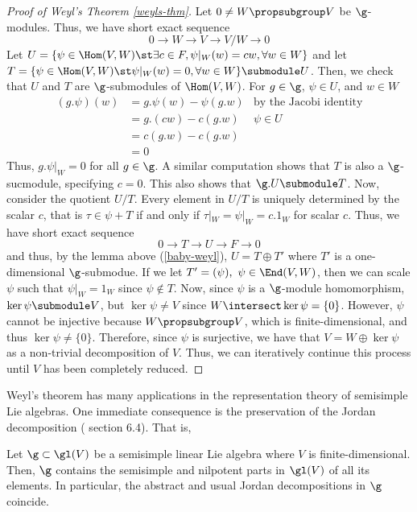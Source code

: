 \documentclass[11pt,leqno,oneside]{amsart}
\numberwithin{thm}{section}
\begin{document}
\begin{proof}[Proof of Weyl's Theorem \ref{weyls-thm}]
  Let \(0 \neq W \propsubgroup V\)  be \(\g\)-modules. Thus, we have
  short exact sequence \[
    0 \to W \to V \to V/W \to 0
  \]
  Let \(U = \{\psi \in \Hom(V,W) \st \exists c \in F, \psi|_W(w) = cw,
  \forall w \in W\}\) and let \(T = \{\psi \in
  \Hom(V,W) \st \psi|_W(w) = 0, \forall w \in W\} \submodule
  U\). Then, we check that \(U\) and \(T\)
  are \(\g\)-submodules of \(\Hom(V,W)\). For \(g \in \g\), \(\psi \in
  U\), and \(w \in W\)
  \begin{align*}
    (g.\psi)(w) & = g.\psi(w) - \psi(g.w) & \text{by the Jacobi
                                            identity} \\
                & = g.(cw) - c(g.w) & \psi \in U \\
                & = c(g.w) - c(g.w) \\
                & = 0
  \end{align*}
  Thus, \(g.\psi|_W = 0\) for all \(g \in \g\). A similar computation
  shows that \(T\) is also a \(\g\)-sucmodule, specifying \(c =
  0\). This also shows that \(\g.U \submodule T\). Now, consider the
  quotient \(U/T\). Every element in \(U/T\) is uniquely determined by
  the scalar \(c\), that is \(\tau \in \psi + T\) if and only if \(\tau|_W =
  \psi|_W = c.1_W\) for scalar \(c\). Thus, we have short exact
  sequence \[
    0 \to T \to U \to F \to 0
  \]
  and thus, by the lemma above (\ref{baby-weyl}), \(U = T \oplus T'\)
  where \(T'\) is a 
  one-dimensional 
  \(\g\)-submodue. If we let \(T' = (\psi),\ \psi \in \End(V,W)\),
  then we can scale \(\psi\) such that \(\psi|_W = 1_W\) since \(\psi
  \not \in T\). Now, since \(\psi\) is a \(\g\)-module homomorphism,
  \(\ker \psi \submodule V\), but \(\ker \psi \neq V\) since \(W
  \intersect \ker \psi = \{0\}\). However, \(\psi\) cannot be injective because \(W
  \propsubgroup V\), which is finite-dimensional, and thus \(\ker \psi
  \neq \{0\}\). Therefore, since \(\psi\) is surjective, we have that
  \(V = W \oplus \ker \psi\) as a non-trivial decomposition of
  \(V\). Thus, we can iteratively continue this process until \(V\)
  has been completely reduced.
\end{proof}
Weyl's theorem has many applications in the representation theory of
semisimple Lie algebras. One immediate consequence is the preservation
of the Jordan decomposition (\cite{humph} section 6.4). That is,
\begin{thm}
  Let \(\g \subset \gl(V)\) be a semisimple linear Lie algebra where
  \(V\) is finite-dimensional. Then, \(\g\) contains the semisimple
  and nilpotent parts in \(\gl(V)\) of all its elements. In
  particular, the abstract and usual Jordan decompositions in \(\g\) coincide.
\end{thm}
\end{document}
